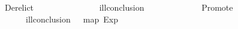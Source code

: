 \ \ {\isacharbar}\ {\isachardoublequoteopen}\ {\isacharparenleft}Derelict\ \ \ \ \ \ {\isacharequal}\isanewline
\ \ \ \ \ \ {\isacharparenleft}\ \ {\isasymand}\ ill{\isacharunderscore}conclusion\ \ {\isacharequal}\ \ {\isacharat}\ {\isacharbrackleft}\ {\isacharat}\ \ {\isasymturnstile}\ \isanewline
\ \ {\isacharbar}\ {\isachardoublequoteopen}\ {\isacharparenleft}Promote\ \ \ \ {\isacharequal}\isanewline
\ \ \ \ \ \ {\isacharparenleft}\ \ {\isasymand}\ ill{\isacharunderscore}conclusion\ \ {\isacharequal}\ map\ Exp\ \ {\isasymturnstile}\ 

